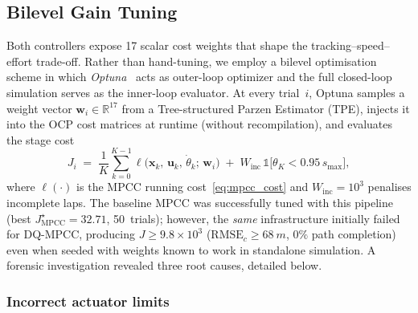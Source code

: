 %


\subsection{Bilevel Gain Tuning}
\label{sec:bilevel_tuning}

Both controllers expose 17 scalar cost weights that shape the
tracking–speed–effort trade-off.
Rather than hand-tuning, we employ a bilevel optimisation scheme
in which \emph{Optuna}~\cite{akiba2019optuna} acts as outer-loop
optimizer and the full closed-loop simulation serves as the
inner-loop evaluator.
At every trial~$i$, Optuna samples a weight vector
$\mathbf{w}_i \in \mathbb{R}^{17}$ from a Tree-structured Parzen
Estimator (TPE), injects it into the OCP cost matrices at runtime
(without recompilation), and evaluates the stage cost
%
\begin{equation}
  J_i \;=\; \frac{1}{K}\sum_{k=0}^{K-1} \ell\!\bigl(
    \mathbf{x}_k,\,\mathbf{u}_k,\,\dot\theta_k;\,\mathbf{w}_i
  \bigr)
  \;+\; W_{\text{inc}}\,\mathbb{1}\!\bigl[\theta_K < 0.95\,s_{\max}\bigr],
  \label{eq:bilevel_obj}
\end{equation}
%
where $\ell(\cdot)$ is the MPCC running cost~\eqref{eq:mpcc_cost}
and $W_{\text{inc}} = 10^{3}$ penalises incomplete laps.
The baseline MPCC was successfully tuned with this pipeline
(best $J^{\star}_{\text{MPCC}} = 32.71$, 50~trials);
however, the \emph{same} infrastructure initially failed
for DQ-MPCC, producing $J \ge 9.8\times 10^{3}$
($\text{RMSE}_{c} \ge \SI{68}{m}$, $0\%$ path completion)
even when seeded with weights known to work in standalone simulation.
A forensic investigation revealed three root causes,
detailed below.


\subsubsection{Incorrect actuator limits}
\label{sec:bug_limits}

